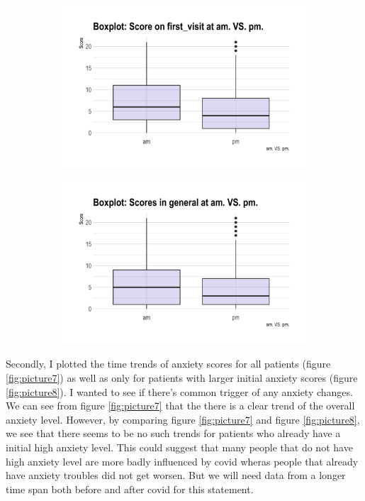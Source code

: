 \documentclass[11pt]{article}
\begin{document}
 \begin{figure}[htb!]
	\caption{Box plots comparing anxiety scores in am. VS. pm.}\label{fig:picture6}
	\begin{subfigure}[h]{0.48\linewidth}
		\includegraphics[width=\linewidth]{Figures/ppp1.png}
		\caption{}\label{fig:ppp1}
	\end{subfigure}
	\hfill
	\begin{subfigure}[h]{0.48\linewidth}
		\includegraphics[width=\linewidth]{Figures/ppp2.png}
		\caption{}\label{fig:ppp2}
	\end{subfigure}
\end{figure}

Secondly, I plotted the time trends of anxiety scores for all patients (figure \ref{fig:picture7}) as well as only for patients with larger initial anxiety scores (figure \ref{fig:picture8}). I wanted to see if there's common trigger of any anxiety changes. We can see from figure \ref{fig:picture7} that the there is a clear trend of the overall anxiety level. 
However, by comparing figure \ref{fig:picture7} and figure \ref{fig:picture8}, we see that there seems to be no such trends for patients who already have a initial high anxiety level. This could suggest that many people that do not have high anxiety level are more badly influenced by covid wheras people that already have anxiety troubles did not get worsen. But we will need data from a longer time span both before and after covid for this statement.
\end{document}
